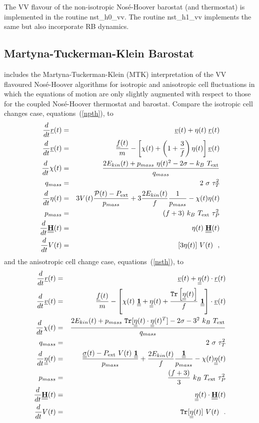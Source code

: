 The VV flavour of the non-isotropic Nos\'e-Hoover
barostat (and thermostat) is implemented in the \D routine
{\sc nst\_h0\_vv}.
The routine {\sc nst\_h1\_vv} implements the
same but also incorporate RB dynamics.

\subsection{Martyna-Tuckerman-Klein Barostat}

\D includes the Martyna-Tuckerman-Klein (MTK) interpretation of the
VV flavoured Nos\'{e}-Hoover algorithms \cite{martyna-96a} for isotropic
and anisotropic cell fluctuations in which the equations of motion are
only slightly augmented with respect to those for the coupled
Nos\'e-Hoover thermostat and
barostat.  Compare the isotropic cell
changes case, equations~(\ref{npth}), to
\begin{eqnarray}
\frac{d}{dt} \mbox{$\underline{r}$}(t) &=& \mbox{$\underline{v}$}(t) + \eta (t) \; \mbox{$\underline{r}$}(t) \nonumber \\
\frac{d}{dt} \mbox{$\underline{v}$}(t) &=& \frac{\mbox{$\underline{f}$}(t)}{m} - \left[ \chi(t) +
\left(1+\frac{3}{f}\right) \eta (t) \right] \mbox{$\underline{v}$}(t) \nonumber \\
\frac{d}{dt} \chi(t) &=& \frac{2 E_{kin}(t) + p_{mass}~\eta (t)^{2} -
2 \sigma - k_{B}~T_{\rm ext}}{q_{mass}} \nonumber \\
q_{mass} &=& 2~\sigma~\tau_{T}^{2} \\
\frac{d}{dt}\eta (t) &=& 3 V(t) \frac{{\cal P}(t) - P_{\rm ext}}{p_{mass}} +
3 \frac{2 E_{kin}(t)}{f} \frac{1}{p_{mass}} - \chi(t) \eta (t) \nonumber \\
p_{mass} &=& (f+3)~k_{B}~T_{\rm ext}~\tau_{P}^{2} \nonumber \\
\frac{d}{dt}\mbox{$\underline{\underline{\bf H}}$}(t) &=& \eta (t) \; \mbox{$\underline{\underline{\bf H}}$}(t) \nonumber \\
\frac{d}{dt} V(t) &=& [3 \eta (t)]~V(t)~~, \nonumber
\end{eqnarray}
and the anisotropic cell change case, equations~(\ref{nsth}), to
\begin{eqnarray}
\frac{d}{dt} \mbox{$\underline{r}$}(t) &=& \mbox{$\underline{v}$}(t) + \mbox{$\underline{\underline{\bf \eta}}$}(t) \cdot  \mbox{$\underline{r}$}(t) \nonumber \\
\frac{d}{dt} \mbox{$\underline{v}$}(t) &=& \frac{\mbox{$\underline{f}$}(t)}{m} - \left[ \chi(t)~\mbox{$\underline{\underline{\bf 1}}$} +
\mbox{$\underline{\underline{\bf \eta}}$}(t) + \frac{{\tt Tr}\left[\mbox{$\underline{\underline{\bf \eta}}$}(t)\right]}{f}~\mbox{$\underline{\underline{\bf 1}}$} \right] \cdot \mbox{$\underline{v}$}(t) \nonumber \\
\frac{d}{dt} \chi(t) &=& \frac{2 E_{kin}(t) + p_{mass}~{\tt Tr}[\mbox{$\underline{\underline{\bf \eta}}$}(t) \cdot
\mbox{$\underline{\underline{\bf \eta}}$}(t)^{T}] - 2 \sigma - 3^{2}~k_{B}~T_{\rm ext}}{q_{mass}} \nonumber \\
q_{mass} &=& 2~\sigma~\tau_{T}^{2} \\
\frac{d}{dt}\mbox{$\underline{\underline{\bf \eta}}$}(t) &=& \frac{\mbox{$\underline{\underline{\bf \sigma}}$}(t) -
P_{\rm ext}~V(t)~\mbox{$\underline{\underline{\bf 1}}$}}{p_{mass}} + \frac{2 E_{kin}(t)}{f} \frac{\mbox{$\underline{\underline{\bf 1}}$}}{p_{mass}} -
\chi(t) \mbox{$\underline{\underline{\bf \eta}}$}(t) \nonumber \\
p_{mass} &=& \frac{(f+3)}{3}~k_{B}~T_{\rm ext}~\tau_{P}^{2} \nonumber \\
\frac{d}{dt}\mbox{$\underline{\underline{\bf H}}$}(t) &=& \mbox{$\underline{\underline{\bf \eta}}$}(t) \cdot \mbox{$\underline{\underline{\bf H}}$}(t) \nonumber \\
\frac{d}{dt} V(t) &=& {\tt Tr} [\mbox{$\underline{\underline{\bf \eta}}$}(t)]~V(t)~~. \nonumber
\end{eqnarray}
